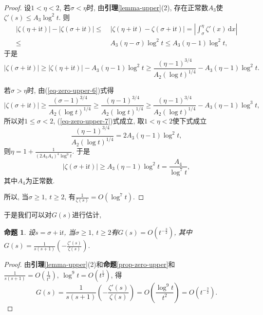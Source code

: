 \documentclass[12pt, a4paper, oneside]{ctexart}
\newtheorem{proposition}{命题}[section]
\numberwithin{equation}{section}  %
\let\leq=\leqslant %
\let\geq=\geqslant %
\def\d{\mathrm{d}}          %
\def\i{\mathrm{i}}          %
\begin{document}
\begin{proof}
    设$1 < \eta < 2$, 若$\sigma < \eta$时, 由\textbf{引理}\ref{lemma-upper}(2), 存在正常数$A_3$使$\zeta'(s)\leq A_3\log^2t$. 则
    \begin{equation*}
        \begin{aligned}
            |\zeta(\eta+\i t)|-|\zeta(\sigma+\i t)|\leq&\ |\zeta(\eta+\i t)-\zeta(\sigma +\i t)| = \left|\int_{\sigma}^{\eta}\zeta'(x)\,\d x\right|\\
            \leq&\ A_3(\eta-\sigma)\log^2t\leq A_3(\eta -1)\log^2t,
        \end{aligned}
    \end{equation*}
    于是
    \begin{equation}\label{eq-zero-upper-7}
        |\zeta(\sigma+\i t)|\geq |\zeta(\eta+\i t)|-A_3(\eta-1)\log^2t\geq\frac{(\eta-1)^{3/4}}{A_2(\log t)^{1/4}}-A_3(\eta-1)\log^2t.
    \end{equation}

    若$\sigma > \eta$时, 由(\ref{eq-zero-upper-6})式得
    \begin{equation*}
        |\zeta(\sigma+\i t)|\geq\frac{(\sigma-1)^{3/4}}{A_2(\log t)^{1/4}}\geq \frac{(\eta-1)^{3/4}}{A_2(\log t)^{1/4}}\geq\frac{(\eta-1)^{3/4}}{A_2(\log t)^{1/4}}-A_3(\eta-1)\log^3t,
    \end{equation*}
    所以对$1\leq \sigma < 2$, (\ref{eq-zero-upper-7})式成立, 取$1 < \eta < 2$使下式成立
    \begin{equation*}
        \frac{(\eta-1)^{3/4}}{A_2(\log t)^{1/4}} = 2A_3(\eta-1)\log^2t,
    \end{equation*}
    则$\eta = 1+\frac{1}{(2A_3A_4)^4\log^9t}$. 于是
    \begin{equation*}
        |\zeta(\sigma + \i t)|\geq A_3(\eta-1)\log^2t = \frac{A_4}{\log^7t},
    \end{equation*}
    其中$A_4$为正常数.

    所以, 当$\sigma \geq 1,\ t\geq 2$, 有$\frac{1}{\zeta(s)} = O(\log^7t)$.
\end{proof}
于是我们可以对$G(s)$进行估计, 
\begin{proposition}\label{prop-G}
    设$s = \sigma + \i t$, 当$\sigma\geq 1,\ t\geq 2$有$G(s) = O(t^{-\frac{3}{2}})$, 其中$G(s) = \frac{1}{s(s+1)}\left(-\frac{\zeta'(s)}{\zeta(s)}\right)$.
\end{proposition}
\begin{proof}
    由\textbf{引理}\ref{lemma-upper}(2)和\textbf{命题}\ref{prop-zero-upper}和$\frac{1}{s(s+1)}=O\left(\frac{1}{t^2}\right),\ \log^9 t= O\left(t^{\frac{1}{2}}\right)$, 得
    \begin{equation*}
        G(s) = \frac{1}{s(s+1)}\left(-\frac{\zeta'(s)}{\zeta(s)}\right) = O\left(\frac{\log^9t}{t^2}\right)=O\left(t^{-\frac{3}{2}}\right).
    \end{equation*}
\end{proof}
\end{document}
